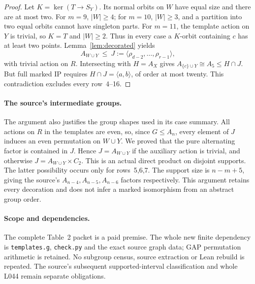 \documentclass[11pt,a4paper]{article}
\newcommand{\gen}[1]{\langle#1\rangle}
\begin{document}
\begin{proof}
Let $K=\ker(T\to S_Y)$. Its normal orbits on $W$ have equal
size and there are at most two. For $m=9$, $|W|\geq4$; for
$m=10$, $|W|\geq3$, and a partition into two equal orbits
cannot have singleton parts. For $m=11$, the template action
on $Y$ is trivial, so $K=T$ and $|W|\geq2$. Thus in every
case a $K$-orbit containing $c$ has at least two points.
Lemma~\ref{lem:decorated} yields
\[
 A_{W\cup Y}\ \leq\ J:=\gen{\rho_{d-2},\ldots,\rho_{r-1}},
\]
with trivial action on $R$. Intersecting with $H=A_X$ gives
$A_{\{c\}\cup Y}\cong A_5\leq H\cap J$. But full marked IP
requires $H\cap J=\gen{a,b}$, of order at most twenty. This
contradiction excludes every row~4--16.
\end{proof}

\paragraph{The source's intermediate groups.}
The argument also justifies the group shapes used in its
case summary. All actions on $R$ in the templates are even,
so, since $G\leq A_n$, every element of $J$ induces an even
permutation on $W\cup Y$. We proved that the pure alternating
factor is contained in $J$. Hence $J=A_{W\cup Y}$ if the
auxiliary action is trivial, and otherwise
$J=A_{W\cup Y}\times C_2$. This is an actual direct product
on disjoint supports. The latter possibility occurs only for
rows~5,6,7. The support size is $n-m+5$, giving the source's
$A_{n-4},A_{n-5},A_{n-6}$ factors respectively. This argument
retains every decoration and does not infer a marked isomorphism
from an abstract group order.

\paragraph{Scope and dependencies.}
The complete Table~2 packet is a paid premise. The whole new
finite dependency is \texttt{templates.g}, \texttt{check.py}
and the exact source graph data; GAP permutation arithmetic
is retained. No subgroup census, source extraction or Lean
rebuild is repeated. The source's subsequent supported-interval
classification and whole L044 remain separate obligations.
\end{document}
